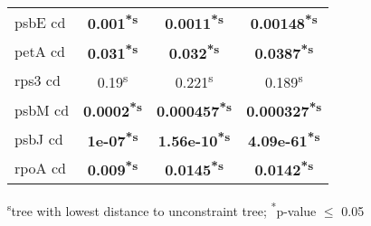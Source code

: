 \documentclass[a4paper]{article}
\begin{document}
\begin{longtable}{l|c|c|c}
psbE cd&\textbf{0.001\textsuperscript{*}\textsuperscript{s}}&\textbf{0.0011\textsuperscript{*}\textsuperscript{s}}&\textbf{0.00148\textsuperscript{*}\textsuperscript{s}}\\
petA cd&\textbf{0.031\textsuperscript{*}\textsuperscript{s}}&\textbf{0.032\textsuperscript{*}\textsuperscript{s}}&\textbf{0.0387\textsuperscript{*}\textsuperscript{s}}\\
rps3 cd&0.19\textsuperscript{s}&0.221\textsuperscript{s}&0.189\textsuperscript{s}\\
psbM cd&\textbf{0.0002\textsuperscript{*}\textsuperscript{s}}&\textbf{0.000457\textsuperscript{*}\textsuperscript{s}}&\textbf{0.000327\textsuperscript{*}\textsuperscript{s}}\\
psbJ cd&\textbf{1e-07\textsuperscript{*}\textsuperscript{s}}&\textbf{1.56e-10\textsuperscript{*}\textsuperscript{s}}&\textbf{4.09e-61\textsuperscript{*}\textsuperscript{s}}\\
rpoA cd&\textbf{0.009\textsuperscript{*}\textsuperscript{s}}&\textbf{0.0145\textsuperscript{*}\textsuperscript{s}}&\textbf{0.0142\textsuperscript{*}\textsuperscript{s}}\\
\end{longtable}
\textsuperscript{s}tree with lowest distance to unconstraint tree; \textsuperscript{*}p-value $\leq$ 0.05
\end{document}
